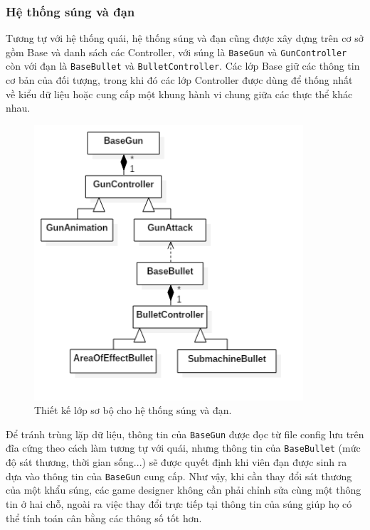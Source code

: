 \documentclass[12pt]{report}
\begin{document}
\subsubsection{Hệ thống súng và đạn}
Tương tự với hệ thống quái, hệ thống súng và đạn cũng được xây dựng trên cơ sở gồm Base và danh sách các Controller, với súng là \texttt{BaseGun} và \texttt{GunController} còn với đạn là \texttt{BaseBullet} và \texttt{BulletController}. Các lớp Base giữ các thông tin cơ bản của đối tượng, trong khi đó các lớp Controller được dùng để thống nhất về kiểu dữ liệu hoặc cung cấp một khung hành vi chung giữa các thực thể khác nhau.
\begin{figure}[H]
  \centering
    \includegraphics[width=10cm]{Pics/Chap4/Gun.png}
  \caption{Thiết kế lớp sơ bộ cho hệ thống súng và đạn.}
  \label{fig:gunclasses}
\end{figure}

Để tránh trùng lặp dữ liệu, thông tin của \texttt{BaseGun} được đọc từ file config lưu trên đĩa cứng theo cách làm tương tự với quái, nhưng thông tin của \texttt{BaseBullet} (mức độ sát thương, thời gian sống...) sẽ được quyết định khi viên đạn được sinh ra dựa vào thông tin của \texttt{BaseGun} cung cấp. Như vậy, khi cần thay đổi sát thương của một khẩu súng, các game designer không cần phải chỉnh sửa cùng một thông tin ở hai chỗ, ngoài ra việc thay đổi trực tiếp tại thông tin của súng giúp họ có thể tính toán cân bằng các thông số tốt hơn.
\end{document}
